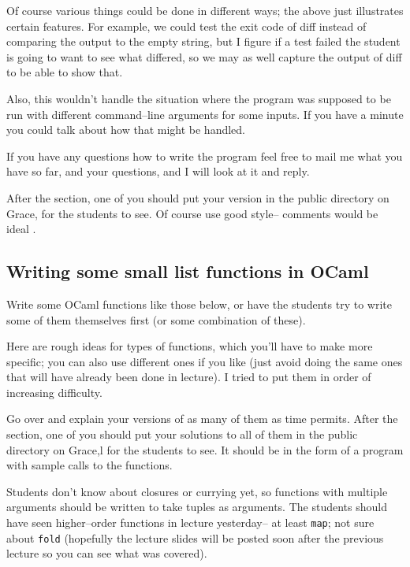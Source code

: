 \documentclass[12pt]{article}
\begin{document}
      \vspace{-2mm}

      Of course various things could be done in different ways; the above just
    illustrates certain features.  For example, we could test the exit code
    of diff instead of comparing the output to the empty string, but I
    figure if a test failed the student is going to want to see what
    differed, so we may as well capture the output of diff to be able to show
    that.

      Also, this wouldn't handle the situation where the program was supposed
    to be run with different command--line arguments for some inputs.  If
    you have a minute you could talk about how that might be handled.

      If you have any questions how to write the program feel free to mail me
    what you have so far, and your questions, and I will look at it and
    reply.

      After the section, one of you should put your version in the public
    directory on Grace, for the students to see.  Of course use good
    style-- comments would be ideal \smiley.

    \subsection{Writing some small list functions in OCaml}

      Write some OCaml functions like those below, or have the students try to
    write some of them themselves first (or some combination of these).

      Here are rough ideas for types of functions, which you'll have to make
    more specific; you can also use different ones if you like (just avoid
    doing the same ones that will have already been done in lecture).  I
    tried to put them in order of increasing difficulty.


      Go over and explain your versions of as many of them as time permits.
    After the section, one of you should put your solutions to all of them
    in the public directory on Grace,l for the students to see.  It should
    be in the form of a program with sample calls to the functions.

      Students don't know about closures or currying yet, so functions with
    multiple arguments should be written to take tuples as arguments.  The
    students should have seen higher--order functions in lecture yesterday--
    at least \texttt{map}; not sure about \texttt{fold} (hopefully the
    lecture slides will be posted soon after the previous lecture so you can
    see what was covered).
\end{document}
